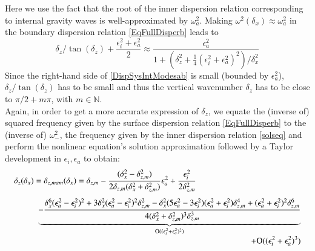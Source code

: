 Here we use the fact that the root of the inner dispersion relation corresponding to internal gravity waves is well-approximated by $\omega_a^2$. Making $\omega^2(\delta_x) \approx\omega_a^2$ in the boundary dispersion relation \ref{EqFullDisperb} leads to 
\begin{equation}
\label{DispSysIntModesab}
\delta_z/\tan(\delta_z)+\frac{\epsilon_i^2+\epsilon_a^2}{2}
\approx
\frac{\epsilon_a^2}{1
	+\left(\delta_z^2+\frac{1}{4}\left(
	\epsilon_i^2+\epsilon_a^2\right)^2\right)/\delta_x^2}
\end{equation}
Since the right-hand side of \ref{DispSysIntModesab} is small (bounded by $\epsilon_a^2$), $\delta_z/\tan(\delta_z)$ has to be small and thus the vertical wavenumber $\delta_z$ has to be close to $\pi/2+m\pi$, with $m\in\mathbb{N}$.\\
%
Again, in order to get a more accurate expression of $\delta_z$, we equate the (inverse of) squared frequency given by the surface dispersion relation \ref{EqFullDisperb} to the (inverse of) $\omega_-^2$, the frequency given by the inner dispersion relation \ref{solseq} and perform the nonlinear equation's solution approximation followed by a Taylor development in $\epsilon_i, \epsilon_a$ to obtain:
\begin{equation}
	\label{ParamallMAM1}
\begin{array}{l}
\displaystyle
\delta_{z}(\delta_x)=\delta_{z,mam}(\delta_x)=
\delta_{z,m}
-\frac{(\delta_x^2-\delta_{z,m}^2)}{2\delta_{z,m}(\delta_x^2+\delta_{z,m}^2)}\epsilon_a^2
+\frac{\epsilon_i^2}{
2\delta_{z,m}^2}
\\[5mm]
\hspace*{1cm}
\displaystyle
\underbrace{
-\frac{\delta_x^6(\epsilon_a^2-\epsilon_i^2)^2+3\delta_x^2(\epsilon_a^2-\epsilon_i^2)^2\delta_{z,m}^2-\delta_x^2(5\epsilon_a^2-3\epsilon_i^2)(\epsilon_a^2+\epsilon_i^2)\delta_{z,m}^4+(\epsilon_a^2+\epsilon_i^2)^2\delta_{z,m}^6}{4(\delta_x^2+\delta_{z,m}^2)^3\delta_{z,m}^3}
}_{\mathrm{O}	((\epsilon_i^2+\epsilon_a^2)^2)}
\\[5mm]
\hfill
\displaystyle
+\mathrm{O}	((\epsilon_i^2+\epsilon_a^2)^3)
\end{array}
\end{equation}
